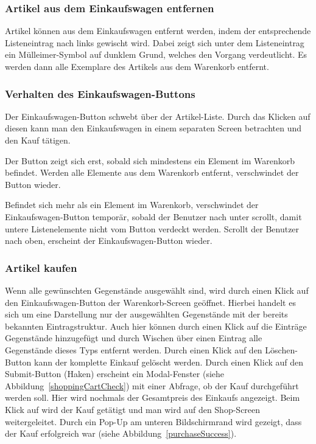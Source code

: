 \subsubsection{Artikel aus dem Einkaufswagen entfernen} \label{subsubsec:shoppingcart-del-item}

Artikel können aus dem Einkaufswagen entfernt werden, indem der entsprechende Listeneintrag nach links gewischt wird.
Dabei zeigt sich unter dem Listeneintrag ein Mülleimer-Symbol auf dunklem Grund, welches den Vorgang verdeutlicht.
Es werden dann alle Exemplare des Artikels aus dem Warenkorb entfernt.

\subsubsection{Verhalten des Einkaufswagen-Buttons} \label{subsubsec:shoppingcart-button}

Der Einkaufswagen-Button schwebt über der Artikel-Liste.
Durch das Klicken auf diesen kann man den Einkaufswagen in einem separaten Screen betrachten und den Kauf tätigen.

Der Button zeigt sich erst, sobald sich mindestens ein Element im Warenkorb befindet.
Werden alle Elemente aus dem Warenkorb entfernt, verschwindet der Button wieder.

Befindet sich mehr als ein Element im Warenkorb, verschwindet der Einkaufswagen-Button temporär, sobald der Benutzer nach unter scrollt, damit untere Listenelemente nicht vom Button verdeckt werden.
Scrollt der Benutzer nach oben, erscheint der Einkaufswagen-Button wieder.

\subsubsection{Artikel kaufen} \label{subsubsec:shop-buy}

Wenn alle gewünschten Gegenstände ausgewählt sind, wird durch einen Klick auf den Einkaufswagen-Button der Warenkorb-Screen geöffnet.
Hierbei handelt es sich um eine Darstellung nur der ausgewählten Gegenstände mit der bereits bekannten Eintragstruktur.
Auch hier können durch einen Klick auf die Einträge Gegenstände hinzugefügt und durch Wischen über einen Eintrag alle Gegenstände dieses Typs entfernt werden.
Durch einen Klick auf den Löschen-Button kann der komplette Einkauf gelöscht werden.
Durch einen Klick auf den Submit-Button (Haken) erscheint ein Modal-Fenster (siehe Abbildung~\ref{shoppingCartCheck}) mit einer Abfrage, ob der Kauf durchgeführt werden soll.
Hier wird nochmals der Gesamtpreis des Einkaufs angezeigt.
Beim Klick auf  wird der Kauf getätigt und man wird auf den Shop-Screen weitergeleitet.
Durch ein Pop-Up am unteren Bildschirmrand wird gezeigt, dass der Kauf erfolgreich war (siehe Abbildung~\ref{purchaseSuccess}).

